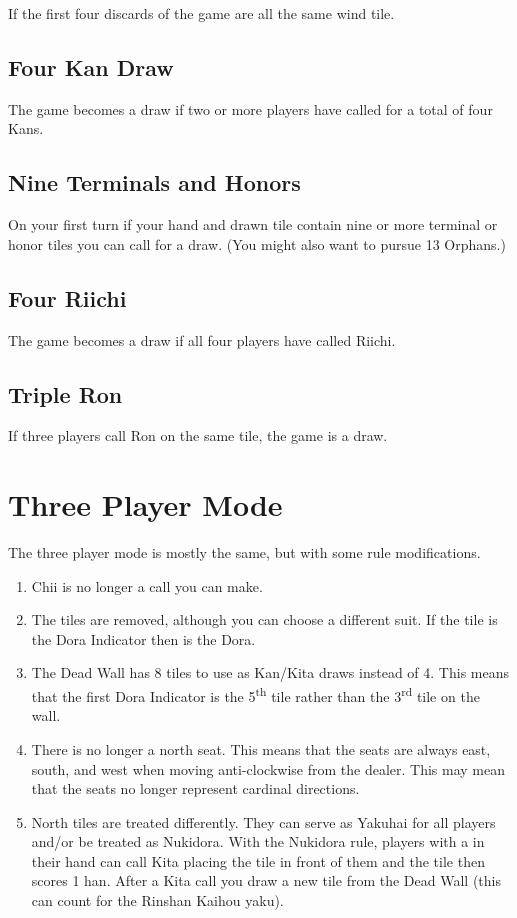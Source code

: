 \documentclass[a4paper,12pt]{article}
\newcommand{\mj}[1]{\mahjong{#1}}
\newcommand{\mmj}[1]{\begin{displayquote}\mahjong{#1}\end{displayquote}}
\begin{document}
If the first four discards of the game are all the same wind 
tile. 
\mmj{2z-2z-2z-2z}

\subsection{Four Kan Draw}

The game becomes a draw if two or more players have called for
a total of four Kans.

\subsection{Nine Terminals and Honors}

On your first turn if your hand and drawn tile contain 
nine or more terminal or honor tiles you can call for a draw.
(You might also want to pursue 13 Orphans.)

\subsection{Four Riichi}

The game becomes a draw if all four players have called Riichi.

\subsection{Triple Ron}

If three players call Ron on the same tile, the game is a draw.

\newpage
\section{Three Player Mode}

The three player mode is mostly the same, but with some rule 
modifications.
\begin{enumerate}
\item Chii is no longer a call you can make.
\item The \mj{2345678m} tiles are removed, although you can 
choose a different suit. If the \mj{1m} tile is the Dora 
Indicator then \mj{9m} is the Dora.
\item The Dead Wall has 8 tiles to use as Kan/Kita draws instead 
of 4. This means that the first Dora Indicator is the 5\textsuperscript{th} 
tile rather than the 3\textsuperscript{rd} tile on the wall.
\item There is no longer a north seat. This means that the 
seats are always east, south, and west when moving anti-clockwise
from the dealer. This may mean that the seats no longer represent
cardinal directions.
\item North tiles are treated differently. They can 
serve as Yakuhai for all players and/or be treated as Nukidora. 
With the Nukidora rule, players with a \mj{4z} in their
hand can call Kita placing the tile in front of them and the 
tile then scores 1 han. After a Kita call you draw a new 
tile from the Dead Wall (this can count for the Rinshan Kaihou
yaku).
\end{enumerate}
\end{document}
